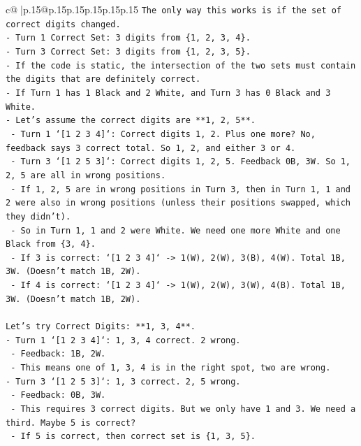 \documentclass{article}
\begin{document}
{\begin{supertabular}{c@{$\;$}|p{.15\linewidth}@{}p{.15\linewidth}p{.15\linewidth}p{.15\linewidth}p{.15\linewidth}p{.15\linewidth}}
{{{\texttt{The only way this works is if the set of correct digits changed.} \\
\texttt{{-} Turn 1 Correct Set: 3 digits from \{1, 2, 3, 4\}.} \\
\texttt{{-} Turn 3 Correct Set: 3 digits from \{1, 2, 3, 5\}.} \\
\texttt{{-} If the code is static, the intersection of the two sets must contain the digits that are definitely correct.} \\
\texttt{{-} If Turn 1 has 1 Black and 2 White, and Turn 3 has 0 Black and 3 White.} \\
\texttt{{-} Let's assume the correct digits are **1, 2, 5**.} \\
\texttt{  {-} Turn 1 `{[}1 2 3 4{]}`: Correct digits 1, 2. Plus one more? No, feedback says 3 correct total. So 1, 2, and either 3 or 4.} \\
\texttt{  {-} Turn 3 `{[}1 2 5 3{]}`: Correct digits 1, 2, 5. Feedback 0B, 3W. So 1, 2, 5 are all in wrong positions.} \\
\texttt{  {-} If 1, 2, 5 are in wrong positions in Turn 3, then in Turn 1, 1 and 2 were also in wrong positions (unless their positions swapped, which they didn't).} \\
\texttt{  {-} So in Turn 1, 1 and 2 were White. We need one more White and one Black from \{3, 4\}.} \\
\texttt{  {-} If 3 is correct: `{[}1 2 3 4{]}` {-}> 1(W), 2(W), 3(B), 4(W). Total 1B, 3W. (Doesn't match 1B, 2W).} \\
\texttt{  {-} If 4 is correct: `{[}1 2 3 4{]}` {-}> 1(W), 2(W), 3(W), 4(B). Total 1B, 3W. (Doesn't match 1B, 2W).} \\
\\ 
\texttt{Let's try Correct Digits: **1, 3, 4**.} \\
\texttt{{-} Turn 1 `{[}1 2 3 4{]}`: 1, 3, 4 correct. 2 wrong.} \\
\texttt{  {-} Feedback: 1B, 2W.} \\
\texttt{  {-} This means one of 1, 3, 4 is in the right spot, two are wrong.} \\
\texttt{{-} Turn 3 `{[}1 2 5 3{]}`: 1, 3 correct. 2, 5 wrong.} \\
\texttt{  {-} Feedback: 0B, 3W.} \\
\texttt{  {-} This requires 3 correct digits. But we only have 1 and 3. We need a third. Maybe 5 is correct?} \\
\texttt{  {-} If 5 is correct, then correct set is \{1, 3, 5\}.} \\
}}}
\end{supertabular}}
\end{document}
